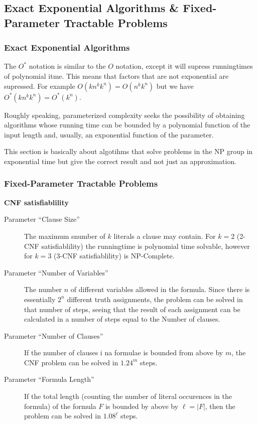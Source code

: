 \subsection{Exact Exponential Algorithms \& Fixed-Parameter Tractable Problems}

\subsubsection{Exact Exponential Algorithms}
The $O^*$ notation is similar to the $O$ notation, except it will supress
runningtimes of polynomial itme. This means that factors that are not
exponential are supressed. For example $O(kn^kk^n) = O(n^kk^n)$ but we have
$O^*(kn^kk^n) = O^*(k^n)$.

Roughly speaking, parameterized complexity seeks the possibility of obtaining
algorithms whose running time can be bounded by a polynomial function of the
input length and, usually, an exponential function of the parameter.


This section is basically about algotihms that solve problems in the NP group in
exponential time but give the correct result and not just an approximation.

\subsubsection{Fixed-Parameter Tractable Problems}

\textbf{CNF satisfiablility}
\begin{description}
\item[Parameter ``Clause Size''] The maximum snumber of $k$ literals a clause
  may contain. For $k = 2$ (2-CNF satisfiablility) the runningtime is polynomial
  time solvable, however for $k = 3$ (3-CNF satisfiablility) is NP-Complete.

\item[Parameter ``Number of Variables''] The number $n$ of different variables
  allowed in the formula. Since there is essentially $2^n$ different truth
  assignments, the problem can be solved in that number of steps, seeing that
  the result of each assignment can be calculated in a number of steps equal to
  the Number of clauses.

\item[Parameter ``Number of Clauses''] If the number of clauses i na formulae is
  bounded from above by $m$, the CNF problem can be solved in $1.24^m$ steps.

\item[Parameter ``Formula Length''] If the total length (counting the number of
  literal occurences in the formula) of the formula $F$ is bounded by above by
  $\ell = |F|$, then the problem can be solved in $1.08^\ell$ steps.
\end{description}